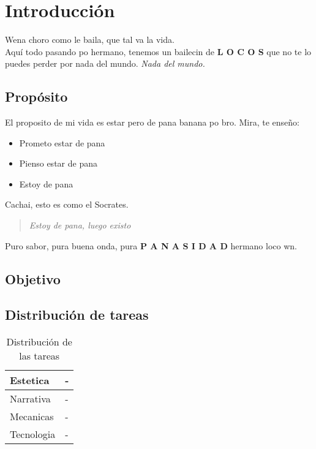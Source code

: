 \section{Introducción}
Wena choro como le baila, que tal va la vida.\\
Aquí todo pasando po hermano, tenemos un bailecin de  \textbf{L O C O S}  que no te lo puedes perder por nada del mundo. \emph{Nada del mundo.}

\subsection{Propósito}
El proposito de mi vida es estar pero de pana banana po bro.
Mira, te enseño:
\begin{itemize}
	\item Prometo estar de pana
	\item Pienso estar de pana
	\item Estoy de pana
\end{itemize}

Cachai, esto es como el Socrates.
\begin{quote}
	\emph{Estoy de pana, luego existo}
\end{quote}
Puro sabor, pura buena onda, pura  \textbf{P A N A S I D A D} hermano loco wn.

\subsection{Objetivo}

\subsection{Distribución de tareas}

\begin{table}[H]
	\begin{center}
		\begin{tabular}{|p{3cm}|p{3cm}|}
		\hline
		Estetica 	& -	\\
		\hline
		Narrativa 	& -	\\
		\hline
		Mecanicas 	& -	\\
		\hline
		Tecnologia 	& -	\\
		\hline
		\end{tabular}
		\caption{Distribución de las tareas}
		\label{tab:distribucion}
	\end{center}
\end{table}

